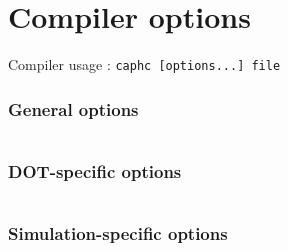 
\chapter{Compiler options}
\label{cha:compiler-options}

Compiler usage : \verb|caphc [options...] file|

\small
\subsection*{General options}
\label{sec:general-options}

\begin{tabular}[c]{ll}

\end{tabular}

\subsection*{DOT-specific options}
\label{sec:dot-options}

\begin{tabular}[c]{ll}

\end{tabular}

\subsection*{Simulation-specific options}
\label{sec:sim-options}

